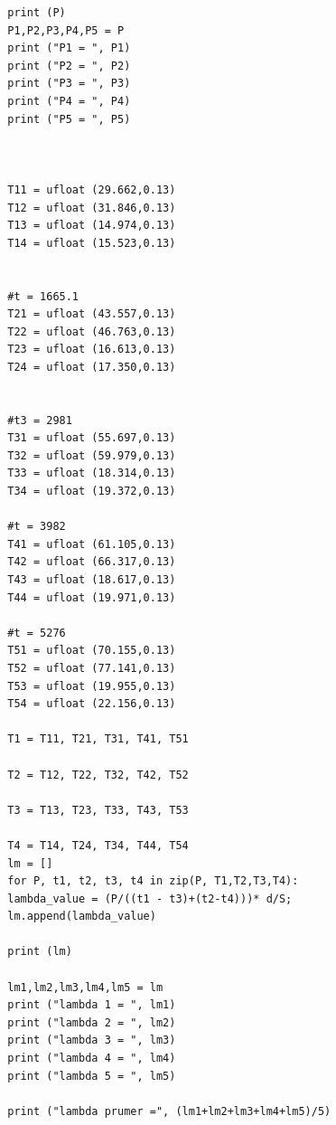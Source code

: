 \documentclass[czech,11pt,a4paper]{article}
\begin{document}
{\begin{verbatim}
		print (P)
		P1,P2,P3,P4,P5 = P
		print ("P1 = ", P1)
		print ("P2 = ", P2)
		print ("P3 = ", P3)
		print ("P4 = ", P4)
		print ("P5 = ", P5)
		
		
		
		T11 = ufloat (29.662,0.13)
		T12 = ufloat (31.846,0.13)
		T13 = ufloat (14.974,0.13)
		T14 = ufloat (15.523,0.13)
		
		
		#t = 1665.1
		T21 = ufloat (43.557,0.13)
		T22 = ufloat (46.763,0.13)
		T23 = ufloat (16.613,0.13)
		T24 = ufloat (17.350,0.13)
		
		
		#t3 = 2981
		T31 = ufloat (55.697,0.13)
		T32 = ufloat (59.979,0.13)
		T33 = ufloat (18.314,0.13)
		T34 = ufloat (19.372,0.13)
		
		#t = 3982
		T41 = ufloat (61.105,0.13)
		T42 = ufloat (66.317,0.13)
		T43 = ufloat (18.617,0.13)
		T44 = ufloat (19.971,0.13)
		
		#t = 5276
		T51 = ufloat (70.155,0.13)
		T52 = ufloat (77.141,0.13)
		T53 = ufloat (19.955,0.13)
		T54 = ufloat (22.156,0.13)
		
		T1 = T11, T21, T31, T41, T51
		
		T2 = T12, T22, T32, T42, T52
		
		T3 = T13, T23, T33, T43, T53
		
		T4 = T14, T24, T34, T44, T54
		lm = []
		for P, t1, t2, t3, t4 in zip(P, T1,T2,T3,T4):
		lambda_value = (P/((t1 - t3)+(t2-t4)))* d/S; 
		lm.append(lambda_value)
		
		print (lm)
		
		lm1,lm2,lm3,lm4,lm5 = lm
		print ("lambda 1 = ", lm1)
		print ("lambda 2 = ", lm2)
		print ("lambda 3 = ", lm3)
		print ("lambda 4 = ", lm4)
		print ("lambda 5 = ", lm5)
		
		print ("lambda prumer =", (lm1+lm2+lm3+lm4+lm5)/5)
	\end{verbatim}}
	
	
\end{document}
